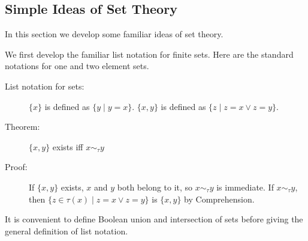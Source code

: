 \documentclass[12pt]{book}
\begin{document}
\newpage

\subsection{Simple Ideas of Set Theory}

In this section we develop some familiar ideas of set theory.

We first develop the familiar list notation for finite sets.  Here are
the standard notations for one and two element sets.

\begin{description}

\item[List notation for sets:]  $\{x\}$ is defined as $\{y \mid y=x\}$.
$\{x,y\}$ is defined as $\{z \mid z=x\vee z=y\}$.

\item[Theorem:]  $\{x,y\}$ exists iff $x \sim_{\tau} y$

\item[Proof:]  If $\{x,y\}$ exists, $x$ and $y$ both belong to it, so $x \sim_{\tau} y$ is immediate.  If $x \sim_{\tau} y$, then $\{z \in \tau(x)\mid z = x \vee z = y\}$ is $\{x,y\}$ by Comprehension.

\end{description}

It is convenient to define Boolean union and intersection of sets
before giving the general definition of list notation.
\end{document}
